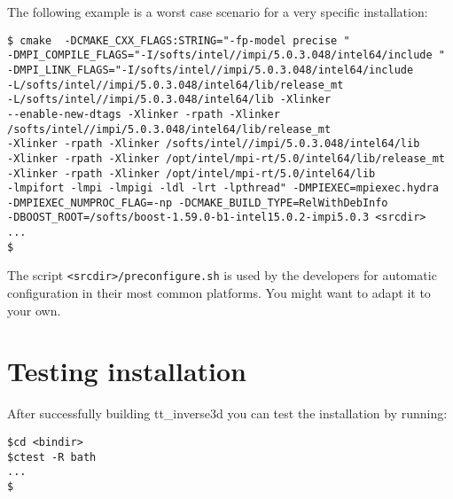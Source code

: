 \documentclass[twoside,final,onecolumn]{article}
\begin{document}
The following example is a worst case scenario for a very specific installation:

\begin{framed}
\begin{verbatim}
$ cmake  -DCMAKE_CXX_FLAGS:STRING="-fp-model precise "
-DMPI_COMPILE_FLAGS="-I/softs/intel//impi/5.0.3.048/intel64/include "
-DMPI_LINK_FLAGS="-I/softs/intel//impi/5.0.3.048/intel64/include
-L/softs/intel//impi/5.0.3.048/intel64/lib/release_mt
-L/softs/intel//impi/5.0.3.048/intel64/lib -Xlinker
--enable-new-dtags -Xlinker -rpath -Xlinker /softs/intel//impi/5.0.3.048/intel64/lib/release_mt
-Xlinker -rpath -Xlinker /softs/intel//impi/5.0.3.048/intel64/lib
-Xlinker -rpath -Xlinker /opt/intel/mpi-rt/5.0/intel64/lib/release_mt
-Xlinker -rpath -Xlinker /opt/intel/mpi-rt/5.0/intel64/lib
-lmpifort -lmpi -lmpigi -ldl -lrt -lpthread" -DMPIEXEC=mpiexec.hydra
-DMPIEXEC_NUMPROC_FLAG=-np -DCMAKE_BUILD_TYPE=RelWithDebInfo
-DBOOST_ROOT=/softs/boost-1.59.0-b1-intel15.0.2-impi5.0.3 <srcdir>
...
$
\end{verbatim}
\end{framed}

The script \verb+<srcdir>/preconfigure.sh+ is used by the developers for automatic configuration in their most common platforms. You might want to adapt it to your own.

\section{Testing installation}

After successfully building tt\_inverse3d you can test the installation by running:

\begin{framed}
\begin{verbatim}
$cd <bindir>
$ctest -R bath
...
$
\end{verbatim}
\end{framed}
\end{document}
